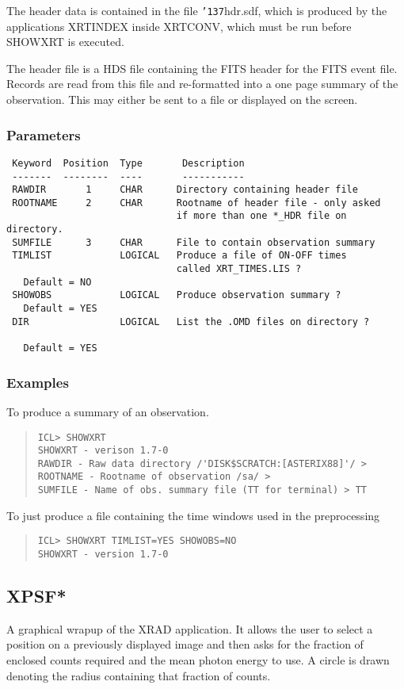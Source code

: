 \documentclass{book}
\renewcommand{\_}{{\tt\char'137}}     %
\begin{document}
The header data is contained in the file \_hdr.sdf, which is
produced by the applications XRTINDEX inside XRTCONV, which must
be run before SHOWXRT is executed.

The header file is a HDS file containing the FITS header for the
FITS event file. Records are read from this file and re-formatted
into a one page summary of the observation. This may either be sent
to a file or displayed on the screen.

\subsubsection{Parameters}
\begin{verbatim}
 Keyword  Position  Type       Description
 -------  --------  ----       -----------
 RAWDIR       1     CHAR      Directory containing header file
 ROOTNAME     2     CHAR      Rootname of header file - only asked
                              if more than one *_HDR file on directory.
 SUMFILE      3     CHAR      File to contain observation summary
 TIMLIST            LOGICAL   Produce a file of ON-OFF times
                              called XRT_TIMES.LIS ?
   Default = NO
 SHOWOBS            LOGICAL   Produce observation summary ?
   Default = YES
 DIR                LOGICAL   List the .OMD files on directory ?

   Default = YES

\end{verbatim}\subsubsection{Examples}
To produce a summary of an observation.
\begin{quote}\begin{verbatim}
ICL> SHOWXRT
SHOWXRT - verison 1.7-0
RAWDIR - Raw data directory /'DISK$SCRATCH:[ASTERIX88]'/ >
ROOTNAME - Rootname of observation /sa/ >
SUMFILE - Name of obs. summary file (TT for terminal) > TT
\end{verbatim}\end{quote}
To just produce a file containing the time windows used in the preprocessing
\begin{quote}\begin{verbatim}
ICL> SHOWXRT TIMLIST=YES SHOWOBS=NO
SHOWXRT - version 1.7-0
\end{verbatim}\end{quote}
\subsection{XPSF*}
A graphical wrapup of the XRAD application. It allows the user to
select a position on a previously displayed image and then asks for
the fraction of enclosed counts required and the mean photon energy
to use. A circle is drawn denoting the radius containing that fraction
of counts.
\end{document}
